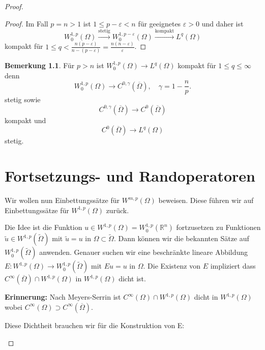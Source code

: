\documentclass[
paper=a4,
bibtotocnumbered,
liststotocnumbered,
tablecaptionabove,
pointlessnumbers,
twoside,
openright,
10pt
]
{report}
\theoremstyle{definition}
\newtheorem*{rem}{Bemerkung}
\numberwithin{equation}{chapter}
\begin{document}
\begin{proof}
\begin{proof}
Im Fall $p=n>1$ ist $1\le p - \varepsilon <n$ für geeignetes $\varepsilon>0$ und daher ist 
\begin{equation}
 W_0^{1,p}(\Omega) \stackrel{\text{stetig}}{\to} W_0^{1,p-\varepsilon}(\Omega) \stackrel{\text{kompakt}}{\to} L^q(\Omega)
\end{equation}
kompakt für $1\le q < \frac{n(p-\varepsilon)}{n-(p-\varepsilon)} = \frac{n(n-\varepsilon)}{\varepsilon}$.
\end{proof}
\begin{rem}
 Für $p>n$ ist $W_0^{1,p}(\Omega) \to L^q(\Omega)$ kompakt für $1\le q \le\infty$ denn 
 \begin{equation}
  W_0^{1,p}(\Omega) \to C^{0,\gamma}(\overline{\Omega}), \quad \gamma = 1-\frac{n}{p}.
 \end{equation}
 stetig sowie 
 \begin{equation}
  C^{0,\gamma}(\overline{\Omega}) \to C^0(\overline{\Omega})
 \end{equation}
kompakt und
 \begin{equation}
  C^0(\overline{\Omega}) \to L^q(\Omega)
 \end{equation}
 stetig.
 
 \chapter{Fortsetzungs- und Randoperatoren}

 Wir wollen nun Einbettungssätze für $W^{m,p}(\Omega)$ beweisen. Diese führen wir auf Einbettungssätze für $W^{1,p}(\Omega)$ zurück.  

 Die Idee ist die Funktion $u\in W^{1,p}(\Omega)=W_0^{1,p}(\mathbb R^n)$ fortzusetzen zu Funktionen $\tilde u \in W^{1,p}(\tilde \Omega)$ mit $\tilde u = u$ in $\Omega\subset \tilde \Omega$.   Dann können wir die bekannten Sätze auf $W_0^{1,p}(\tilde \Omega)$ anwenden.   Genauer suchen wir eine beschränkte lineare Abbildung $E: W^{1,p}(\Omega)\to W_0^{1,p}(\tilde \Omega)$ mit $Eu=u$ in $\Omega$.  Die Existenz von $E$ impliziert dass $C^\infty(\overline{\Omega}) \cap W^{1,p}(\Omega)$ in $W^{1,p}(\Omega)$ dicht ist.
 
 \textbf{Erinnerung:} Nach Meyers-Serrin ist $C^\infty(\Omega) \cap W^{1,p}(\Omega)$ dicht in $W^{1,p}(\Omega)$ wobei $C^\infty(\Omega) \supset C^\infty(\overline{\Omega})$.

Diese Dichtheit brauchen wir für die Konstruktion von E:
\end{rem}


\end{proof}
\end{document}
